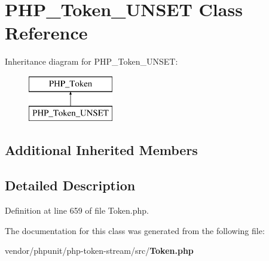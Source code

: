 \section{P\+H\+P\+\_\+\+Token\+\_\+\+U\+N\+S\+E\+T Class Reference}
\label{class_p_h_p___token___u_n_s_e_t}
Inheritance diagram for P\+H\+P\+\_\+\+Token\+\_\+\+U\+N\+S\+E\+T\+:\begin{figure}[H]
\begin{center}
\leavevmode
\includegraphics[height=2.000000cm]{class_p_h_p___token___u_n_s_e_t}
\end{center}
\end{figure}
\subsection*{Additional Inherited Members}


\subsection{Detailed Description}


Definition at line 659 of file Token.\+php.



The documentation for this class was generated from the following file\+:\begin{DoxyCompactItemize}
\item 
vendor/phpunit/php-\/token-\/stream/src/{\bf Token.\+php}\end{DoxyCompactItemize}
